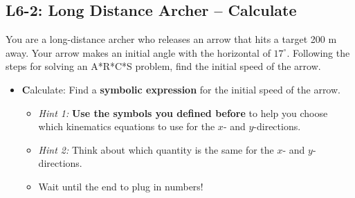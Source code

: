 \documentclass[]{article}
\begin{document}
\begin{PresentSpace}
\vspace{-10pt}
\section*{L6-2: Long Distance Archer -- Calculate}
\vspace{-10pt}
You are a long-distance archer who releases an arrow that hits a target 200 m away. Your arrow makes an initial angle with the horizontal of $17^{\circ}$. Following the steps for solving an A*R*C*S problem, find the initial speed of the arrow.
\begin{itemize}
	\item \textbf{C}alculate: Find a \textbf{symbolic expression} for the initial speed of the arrow.
	\begin{itemize}
		\item \textit{Hint 1:} \textbf{Use the symbols you defined before} to help you choose which kinematics equations to use for the $x$- and $y$-directions.
		\item \textit{Hint 2:} Think about which quantity is the same for the $x$- and $y$-directions.
		\item Wait until the end to plug in numbers!
	\end{itemize}
\end{itemize}
\end{PresentSpace}
\newpage
\end{document}
